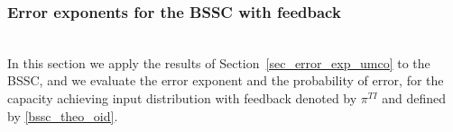 \documentclass[11pt, a4paper, journal,onecolumn]{IEEEtran}
\newcommand{\noi}{\noindent}
\begin{document}

\subsubsection{Error exponents for the BSSC with feedback} \label{ee_bssc} \ \\

\noi In this section we apply the results of Section~\ref{sec_error_exp_umco} to the BSSC, and we evaluate the error exponent and the probability of error, for the capacity achieving  input distribution with feedback denoted by $\pi^{TI}$ and defined by \eqref{bssc_theo_oid}.
\end{document}
